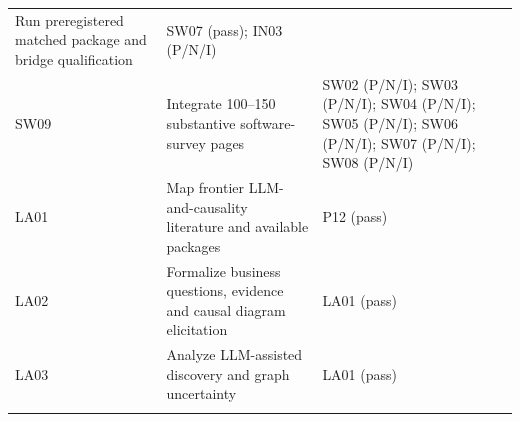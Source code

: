 \documentclass[
  11pt,
  a4paper,
]{article}
\begin{document}
\begin{longtable}[]{@{}lll@{}}
\begin{minipage}[t]{0.30\columnwidth}
Run preregistered matched package and bridge qualification\strut
\end{minipage} & \begin{minipage}[t]{0.30\columnwidth}\raggedright
SW07 (pass); IN03 (P/N/I)\strut
\end{minipage}\tabularnewline
\begin{minipage}[t]{0.30\columnwidth}\raggedright
SW09\strut
\end{minipage} & \begin{minipage}[t]{0.30\columnwidth}\raggedright
Integrate 100--150 substantive software-survey pages\strut
\end{minipage} & \begin{minipage}[t]{0.30\columnwidth}\raggedright
SW02 (P/N/I); SW03 (P/N/I); SW04 (P/N/I); SW05 (P/N/I); SW06 (P/N/I);
SW07 (P/N/I); SW08 (P/N/I)\strut
\end{minipage}\tabularnewline
\begin{minipage}[t]{0.30\columnwidth}\raggedright
LA01\strut
\end{minipage} & \begin{minipage}[t]{0.30\columnwidth}\raggedright
Map frontier LLM-and-causality literature and available packages\strut
\end{minipage} & \begin{minipage}[t]{0.30\columnwidth}\raggedright
P12 (pass)\strut
\end{minipage}\tabularnewline
\begin{minipage}[t]{0.30\columnwidth}\raggedright
LA02\strut
\end{minipage} & \begin{minipage}[t]{0.30\columnwidth}\raggedright
Formalize business questions, evidence and causal diagram
elicitation\strut
\end{minipage} & \begin{minipage}[t]{0.30\columnwidth}\raggedright
LA01 (pass)\strut
\end{minipage}\tabularnewline
\begin{minipage}[t]{0.30\columnwidth}\raggedright
LA03\strut
\end{minipage} & \begin{minipage}[t]{0.30\columnwidth}\raggedright
Analyze LLM-assisted discovery and graph uncertainty\strut
\end{minipage} & \begin{minipage}[t]{0.30\columnwidth}\raggedright
LA01 (pass)\strut
\end{minipage}\tabularnewline
\begin{minipage}[t]{0.30\columnwidth}\raggedright

\end{minipage}
\end{longtable}
\end{document}
